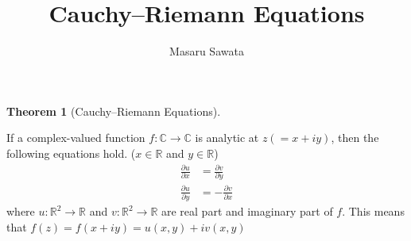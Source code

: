 \documentclass[letterpaper, 12pt]{article}
\title{Cauchy--Riemann Equations}
\author{Masaru Sawata}
\theoremstyle{custom}
\newtheorem*{theorem}{Theorem}
\begin{document}
\maketitle

\begin{theorem}[Cauchy--Riemann Equations]
\end{theorem}
If a complex-valued function $f: \mathbb{C} \rightarrow \mathbb{C}$ is analytic at $z(=x+iy)$, then the following equations hold. ($x\in \mathbb{R}$ and $y\in \mathbb{R}$)
\begin{align*}
  \frac{\partial u}{\partial x} &= \frac{\partial v}{\partial y} \\
  \frac{\partial u}{\partial y} &= -\frac{\partial v}{\partial x}
\end{align*}
where $u: \mathbb{R}^2 \rightarrow \mathbb{R}$ and $v: \mathbb{R}^2 \rightarrow \mathbb{R}$ are real part and imaginary part of $f$.
This means that $f(z) = f(x+iy) = u(x,y) + iv(x,y)$\\
\end{document}
